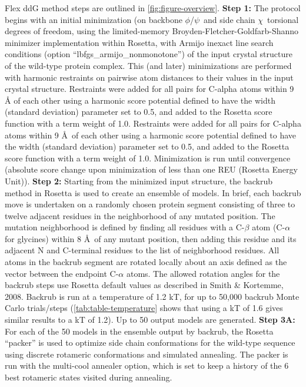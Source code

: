 Flex ddG method steps are outlined in \cref{fig:figure-overview}.
\textbf{Step 1:} The protocol begins with an initial minimization (on backbone $\phi$/$\psi$\ and side chain $\chi$\ torsional degrees of freedom, using the limited-memory Broyden-Fletcher-Goldfarb-Shanno minimizer implementation within Rosetta, with Armijo inexact line search conditions (option ``lbfgs\_armijo\_nonmonotone'') of the input crystal structure of the wild-type protein complex.
This (and later) minimizations are performed with harmonic restraints on pairwise atom distances to their values in the input crystal structure. Restraints were added for all pairs for C-alpha atoms within 9 Å of each other using a harmonic score potential defined to have the width (standard deviation) parameter set to 0.5, and added to the Rosetta score function with a term weight of 1.0.
Restraints were added for all pairs for C-alpha atoms within 9 \AA\ of each other using a harmonic score potential defined to have the width (standard deviation) parameter set to 0.5, and added to the Rosetta score function with a term weight of 1.0.
Minimization is run until convergence (absolute score change upon minimization of less than one REU (Rosetta Energy Unit)).
\textbf{Step 2:} Starting from the minimized input structure, the backrub method in Rosetta\cite{smith_backrub-like_2008} is used to create an ensemble of models. In brief, each backrub move is undertaken on a randomly chosen protein segment consisting of three to twelve adjacent residues in the neighborhood of any mutated position.
The mutation neighborhood is defined by finding all residues with a C-$\beta$ atom (C-$\alpha$ for glycines) within 8 \AA\ of any mutant position, then adding this residue and its adjacent N and C-terminal residues to the list of neighborhood residues.
All atoms in the backrub segment are rotated locally about an axis defined as the vector between the endpoint C-$\alpha$ atoms.
The allowed rotation angles for the backrub steps use Rosetta default values as described in Smith \& Kortemme, 2008\cite{smith_backrub-like_2008}.
Backrub is run at a temperature of 1.2 kT, for up to 50,000 backrub Monte Carlo trials/steps (\cref{tab:table-temperature} shows that using a kT of 1.6 gives similar results to a kT of 1.2).
Up to 50 output models are generated.
\textbf{Step 3A:} For each of the 50 models in the ensemble output by backrub, the Rosetta ``packer'' is used to optimize side chain conformations for the wild-type sequence using discrete rotameric conformations \cite{shapovalov_smoothed_2011} and simulated annealing. The packer is run with the multi-cool annealer option\cite{leaver-fay_generic_2011}, which is set to keep a history of the 6 best rotameric states visited during annealing.
